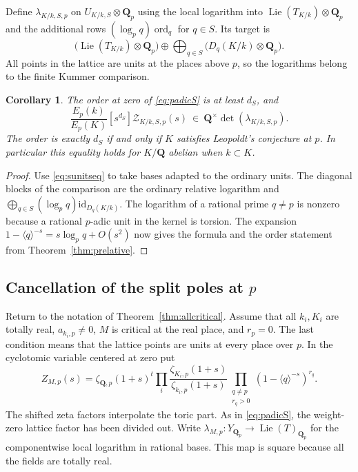 \documentclass[11pt]{amsart}
\numberwithin{equation}{section}
\newtheorem{corollary}[theorem]{Corollary}
\theoremstyle{definition}
\theoremstyle{remark}
\newcommand{\Q}{\mathbf Q}
\newcommand{\ord}{\operatorname{ord}}
\newcommand{\Lie}{\operatorname{Lie}}
\begin{document}
Define $\lambda_{K/k,S,p}$ on $U_{K/k,S}\otimes\Q_p$
using the local logarithm into $\Lie(T_{K/k})\otimes\Q_p$
and the additional rows $(\log_p q)\ord_q$ for $q\in S$.
Its target is
\[
  \bigl(\Lie(T_{K/k})\otimes\Q_p\bigr)
   \oplus\bigoplus_{q\in S}\bigl(D_q(K/k)\otimes\Q_p\bigr).
\]
All points in the lattice are units at the places above
$p$, so the logarithms belong to the finite Kummer comparison.

\begin{corollary}\label{cor:padicS}
The order at zero of \eqref{eq:padicS} is at least $d_S$, and
\[
 \frac{E_p(k)}{E_p(K)}[s^{d_S}]\mathcal Z_{K/k,S,p}(s)
       \ \in\ \Q^\times\det(\lambda_{K/k,S,p}).
\]
The order is exactly $d_S$ if and only if $K$
satisfies Leopoldt's conjecture at $p$. In particular
this equality holds for $K/\Q$ abelian when $k\subset K$.
\end{corollary}

\begin{proof}
Use \eqref{eq:sunitseq} to take bases adapted to the ordinary
units. The diagonal blocks of the comparison are the
ordinary relative logarithm and
$\bigoplus_{q\in S}(\log_p q)\mathrm{id}_{D_q(K/k)}$.
The logarithm of a rational prime $q\ne p$ is nonzero
because a rational $p$-adic unit in the kernel is torsion.
The expansion $1-\langle q\rangle^{-s}=s\log_p q+O(s^2)$
now gives the formula and the order statement from
Theorem~\ref{thm:prelative}.
\end{proof}

\subsection{Cancellation of the split poles at \texorpdfstring{$p$}{p}}

Return to the notation of Theorem~\ref{thm:allcritical}. Assume
that all $k_i,K_i$ are totally real, $a_{k_i,p}\ne0$, $M$ is
critical at the real place, and $r_p=0$. The last condition means
that the lattice points are units at every place over $p$.
In the cyclotomic variable centered at zero put
\begin{equation}\label{eq:splitpadicgerm}
 Z_{M,p}(s)=\zeta_{\Q,p}(1+s)^t
 \prod_i\frac{\zeta_{K_i,p}(1+s)}{\zeta_{k_i,p}(1+s)}
 \prod_{\substack{q\ne p\\r_q>0}}(1-\langle q\rangle^{-s})^{r_q}.
\end{equation}
The shifted zeta factors interpolate the toric part. As in
\eqref{eq:padicS}, the weight-zero lattice factor has been divided
out. Write $\lambda_{M,p}:Y_{\Q_p}\to\Lie(T)_{\Q_p}$ for the
componentwise local logarithm in rational bases. This map is square
because all the fields are totally real.
\end{document}
